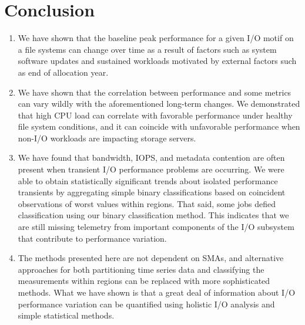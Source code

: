 \section{Conclusion}




\begin{enumerate}
\item We have shown that the baseline peak performance for a given I/O motif on a file systems can change over time as a result of factors such as system software updates and sustained workloads motivated by external factors such as end of allocation year.

\item We have shown that the correlation between performance and some metrics can vary wildly with the aforementioned long-term changes.
We demonstrated that high CPU load can correlate with favorable performance under healthy file system conditions, and it can coincide with unfavorable performance when non-I/O workloads are impacting storage servers.

\item We have found that bandwidth, IOPS, and metadata contention are often present when transient I/O performance problems are occurring.
We were able to obtain statistically significant trends about isolated performance transients by aggregating simple binary classifications based on coincident observations of worst values within regions.
That said, some jobs defied classification using our binary classification method.
This indicates that we are still missing telemetry from important components of the I/O subsystem that contribute to performance variation.

\item The methods presented here are not dependent on SMAs, and alternative approaches for both partitioning time series data and classifying the measurements within regions can be replaced with more sophisticated methods.
What we have shown is that a great deal of information about I/O performance variation can be quantified using holistic I/O analysis and simple statistical methods.
\end{enumerate}
